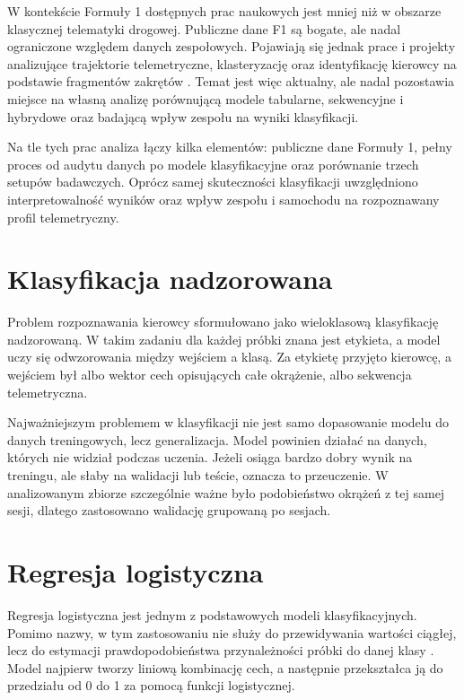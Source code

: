 \documentclass[printmode,pl]{mgr}
\begin{document}
W kontekście Formuły 1 dostępnych prac naukowych jest mniej niż w obszarze klasycznej telematyki drogowej. Publiczne dane F1 są bogate, ale nadal ograniczone względem danych zespołowych. Pojawiają się jednak prace i projekty analizujące trajektorie telemetryczne, klasteryzację oraz identyfikację kierowcy na podstawie fragmentów zakrętów \cite{f1_fda_thesis,withseismic2026}. Temat jest więc aktualny, ale nadal pozostawia miejsce na własną analizę porównującą modele tabularne, sekwencyjne i hybrydowe oraz badającą wpływ zespołu na wyniki klasyfikacji.

Na tle tych prac analiza łączy kilka elementów: publiczne dane Formuły 1, pełny proces od audytu danych po modele klasyfikacyjne oraz porównanie trzech setupów badawczych. Oprócz samej skuteczności klasyfikacji uwzględniono interpretowalność wyników oraz wpływ zespołu i samochodu na rozpoznawany profil telemetryczny.

\section{Klasyfikacja nadzorowana}

Problem rozpoznawania kierowcy sformułowano jako wieloklasową klasyfikację nadzorowaną. W takim zadaniu dla każdej próbki znana jest etykieta, a model uczy się odwzorowania między wejściem a klasą. Za etykietę przyjęto kierowcę, a wejściem był albo wektor cech opisujących całe okrążenie, albo sekwencja telemetryczna.

Najważniejszym problemem w klasyfikacji nie jest samo dopasowanie modelu do danych treningowych, lecz generalizacja. Model powinien działać na danych, których nie widział podczas uczenia. Jeżeli osiąga bardzo dobry wynik na treningu, ale słaby na walidacji lub teście, oznacza to przeuczenie. W analizowanym zbiorze szczególnie ważne było podobieństwo okrążeń z tej samej sesji, dlatego zastosowano walidację grupowaną po sesjach.

\section{Regresja logistyczna}

Regresja logistyczna jest jednym z podstawowych modeli klasyfikacyjnych. Pomimo nazwy, w tym zastosowaniu nie służy do przewidywania wartości ciągłej, lecz do estymacji prawdopodobieństwa przynależności próbki do danej klasy \cite{bishop2006}. Model najpierw tworzy liniową kombinację cech, a następnie przekształca ją do przedziału od 0 do 1 za pomocą funkcji logistycznej.
\end{document}
